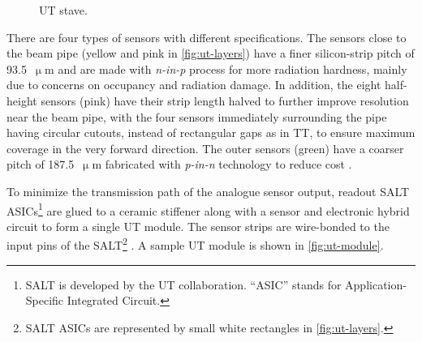 \begin{figure}[!htb]
    \caption{
        UT stave.
    }
    \label{fig:stave}
\end{figure}

There are four types of sensors with different specifications.
The sensors close to the beam pipe (yellow and pink in \cref{fig:ut-layers})
have a finer silicon-strip pitch of 93.5~$\upmu$m and are made with
\emph{n-in-p} process for more radiation hardness,
mainly due to concerns on occupancy and radiation damage.
In addition, the eight half-height sensors (pink) have their strip length halved
to further improve resolution near the beam pipe,
with the four sensors immediately surrounding the pipe having
circular cutouts, instead of rectangular gaps as in TT, to ensure maximum
coverage in the very forward direction.
The outer sensors (green) have a coarser pitch of 187.5~$\upmu$m fabricated with
\emph{p-in-n} technology to reduce cost
\cite{Carli:2783293}.

To minimize the transmission path of the analogue sensor output, readout
SALT ASICs\footnote{
    SALT is developed by the UT collaboration.
    ``ASIC'' stands for Application-Specific Integrated Circuit.
} are glued to a ceramic stiffener along with a sensor and electronic hybrid
circuit to form a single UT module.
The sensor strips are wire-bonded to the input pins of the SALT\footnote{
    SALT ASICs are represented by small white rectangles in
    \cref{fig:ut-layers}.
}
\cite{Wang:2015mem}.
A sample UT module is shown in \cref{fig:ut-module}.

